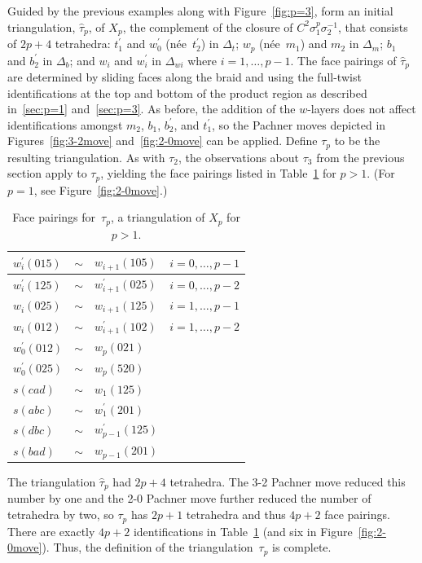 \documentclass[reqno]{amsart}
\theoremstyle{plain}
\theoremstyle{definition}
\begin{document}
Guided by the previous examples along with Figure~\ref{fig:p=3},  form an initial triangulation, $\hat{\tau}_p$,  of $X_{p}$, the complement of the closure of $C^2\sigma_1^p\sigma_2^{-1}$, that consists of $2p+4$ tetrahedra:  $t_1^\prime$ and $w_0^\prime$ (n\'ee~$t_2^\prime$) in $\Delta_t$; $w_p$ (n\'ee~$m_1$) and $m_2$ in $\Delta_m$; $b_1$ and $b_2^\prime$ in $\Delta_b$; and $w_i$ and $w_i^\prime$ in $\Delta_{wi}$ where $i=1,\dots, p-1$.  The face pairings of $\hat{\tau}_p$ are determined by sliding faces along the braid and using the full-twist identifications at the top and bottom of the product region as described in~\ref{sec:p=1} and~\ref{sec:p=3}.  As before, the addition of the $w$-layers does not affect identifications amongst $m_2$, $b_1$, $b_2^\prime$, and $t_1^\prime$, so the Pachner moves depicted in Figures~\ref{fig:3-2move} and~\ref{fig:2-0move} can be applied.  Define $\tau_{p}$ to be the resulting triangulation.  As with $\tau_{2}$, the observations about $\tau_{3}$ from the previous section apply to $\tau_{p}$, yielding the  face pairings listed in Table~\ref{table:anyp} for $p>1$.  (For $p=1$, see Figure~\ref{fig:2-0move}.)

\begin{table}[ht]
\caption{Face pairings for~$\tau_{p}$, a triangulation of $X_{p}$ for $p>1$.\label{table:anyp}}
\begin{tabular}{ |l c l l |}
   \hline
$w_i^\prime(015)$    &$\sim$	&$w_{i+1}(105)$ & $i=0,\dots,p-1$\\
  \hline
 $w_i^\prime(125)$    &$\sim$	&$w_{i+1}^\prime(025)$ & $i=0,\dots,p-2$\\
  \hline
$w_i(025)$    &$\sim$	&$w_{i+1}(125)$ & $i=1,\dots,p-1$\\
  \hline
 $w_i(012)$    &$\sim$	&$w_{i+1}^\prime(102)$ &$i=1,\dots,p-2$\\
  \hline
  $w_0^\prime(012)$    &$\sim$	&$w_p(021)$&\\
  \hline
$w_0^\prime(025)$    &$\sim$	&$w_p(520)$&\\
  \hline
$s(cad)$    &$\sim$	&$w_1(125)$ &\\
  \hline
$s(abc)$    &$\sim$	&$w_1^\prime(201)$&\\
  \hline
$s(dbc)$    &$\sim$	&$w_{p-1}^\prime(125)$&\\
 \hline
$s(bad)$    &$\sim$	&$w_{p-1}(201)$&\\
 \hline
 \end{tabular}
\end{table}

The triangulation $\hat{\tau}_p$ had $2p+4$ tetrahedra.  The 3-2 Pachner move reduced this number by one and the 2-0 Pachner move further reduced the number of tetrahedra by two, so $\tau_{p}$ has $2p+1$ tetrahedra and thus $4p+2$ face pairings.  There are exactly $4p+2$ identifications in Table~\ref{table:anyp} (and six in Figure~\ref{fig:2-0move}).  Thus, the definition of the triangulation~$\tau_{p}$ is complete.  
\end{document}

